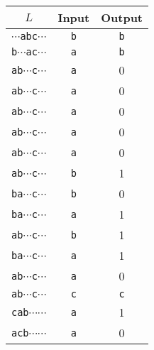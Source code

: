\documentclass{article}
\begin{document}
\thispagestyle{empty}
\begin{tabular}{ccc}
 $L$ & Input & Output \\
\hline
{\tt $\cdots$abc$\cdots$} & {\tt b} &  {\tt b}\\
{\tt b$\cdots$ac$\cdots$} & {\tt a} &  {\tt b}\\
{\tt ab$\cdots$c$\cdots$} & {\tt a} &     0\\
{\tt ab$\cdots$c$\cdots$} & {\tt a} &     0\\
{\tt ab$\cdots$c$\cdots$} & {\tt a} &     0\\
{\tt ab$\cdots$c$\cdots$} & {\tt a} &     0\\
{\tt ab$\cdots$c$\cdots$} & {\tt a} &     0\\
{\tt ab$\cdots$c$\cdots$} & {\tt b} &     1\\
{\tt ba$\cdots$c$\cdots$} & {\tt b} &     0\\
{\tt ba$\cdots$c$\cdots$} & {\tt a} &     1\\
{\tt ab$\cdots$c$\cdots$} & {\tt b} &     1\\
{\tt ba$\cdots$c$\cdots$} & {\tt a} &     1\\
{\tt ab$\cdots$c$\cdots$} & {\tt a} &     0\\
{\tt ab$\cdots$c$\cdots$} & {\tt c} &   {\tt c}\\
{\tt cab$\cdots$$\cdots$} & {\tt a} &     1\\    
{\tt acb$\cdots$$\cdots$} & {\tt a} &     0\\
\end{tabular}
\end{document}
